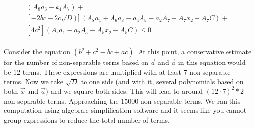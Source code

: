 \documentclass[UKenglish]{lipics-v2019}
\begin{document}
\begin{align*}
[ b^2 - 2b\sqrt{D} + D](A_8 a_3-a_4 A_7) + \\
[-2bc -2c\sqrt{D})](A_8 a_1+ A_6 a_3 - a_4 A_5- a_2 A_7 - A_7x_2 - A_7 C) + \\
[4c^2](A_6 a_1- a_2 A_5 - A_5 x_2 - A_5 C) \le 0 \\
\end{align*}

Consider the equation $(b^2 + c^2 - bc + ac)$. At this point, a conservative estimate for the number of non-separable terms based on $\vec{a}$ and $\vec{a}$ in this equation would be $12$ terms. These expressions are multiplied with at least $7$ non-separable terms. Now we take $\sqrt{D}$ to one side (and with it, several polynomials based on both $\vec{x}$ and $\vec{a}$) and we square both sides. This will lead to around $(12\cdot 7)^2 * 2$ non-separable terms. Approaching the $15000$ non-separable terms. We ran this computation using algebraic-simplification software and it seems like you cannot group expressions to reduce the total number of terms.
\end{document}
